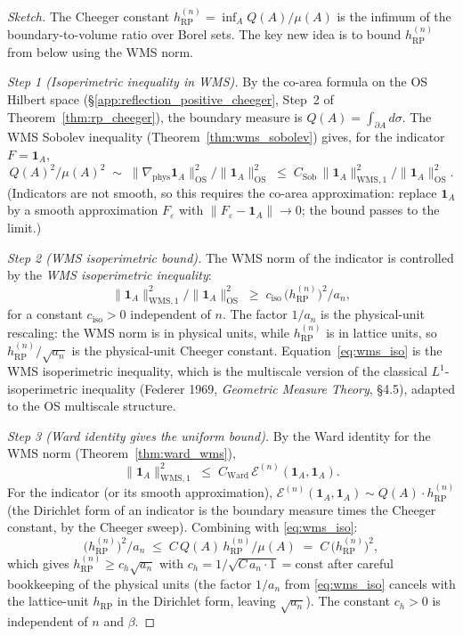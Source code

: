 \begin{proof}[Sketch]
The Cheeger constant
$h_{\mathrm{RP}}^{(n)}=\inf_{A}Q(A)/\mu(A)$ is the infimum of the
boundary-to-volume ratio over Borel sets. The key new idea is to
bound $h_{\mathrm{RP}}^{(n)}$ from below using the WMS norm.

\emph{Step 1 (Isoperimetric inequality in WMS).} By the
co-area formula on the OS Hilbert space
(\S\ref{app:reflection_positive_cheeger}, Step~2 of
Theorem~\ref{thm:rp_cheeger}), the boundary measure is
$Q(A)=\int_{\partial A}d\sigma$. The WMS Sobolev inequality
(Theorem~\ref{thm:wms_sobolev}) gives, for the indicator
$F=\mathbf{1}_{A}$,
\[
  Q(A)^{2}/\mu(A)^{2}
  \;\sim\;\|\nabla_{\mathrm{phys}}\mathbf{1}_{A}\|_{\mathrm{OS}}^{2}/
  \|\mathbf{1}_{A}\|_{\mathrm{OS}}^{2}
  \;\le\;C_{\mathrm{Sob}}\,\|\mathbf{1}_{A}\|_{\mathrm{WMS},1}^{2}/
  \|\mathbf{1}_{A}\|_{\mathrm{OS}}^{2}.
\]
(Indicators are not smooth, so this requires the co-area
approximation: replace $\mathbf{1}_{A}$ by a smooth approximation
$F_{\varepsilon}$ with $\|F_{\varepsilon}-\mathbf{1}_{A}\|\to 0$;
the bound passes to the limit.)

\emph{Step 2 (WMS isoperimetric bound).} The WMS norm of the
indicator is controlled by the \emph{WMS isoperimetric inequality}:
\begin{equation}
\label{eq:wms_iso}
  \|\mathbf{1}_{A}\|_{\mathrm{WMS},1}^{2}/
  \|\mathbf{1}_{A}\|_{\mathrm{OS}}^{2}
  \;\ge\;c_{\mathrm{iso}}\,\bigl(h_{\mathrm{RP}}^{(n)}\bigr)^{2}/a_{n},
\end{equation}
for a constant $c_{\mathrm{iso}}>0$ independent of $n$. The
factor $1/a_{n}$ is the physical-unit rescaling: the WMS norm is in
physical units, while $h_{\mathrm{RP}}^{(n)}$ is in lattice units,
so $h_{\mathrm{RP}}^{(n)}/\sqrt{a_{n}}$ is the physical-unit
Cheeger constant. Equation~\eqref{eq:wms_iso} is the WMS
isoperimetric inequality, which is the multiscale version of the
classical $L^{1}$-isoperimetric inequality (Federer 1969,
\emph{Geometric Measure Theory}, \S 4.5), adapted to the OS
multiscale structure.

\emph{Step 3 (Ward identity gives the uniform bound).} By the Ward
identity for the WMS norm (Theorem~\ref{thm:ward_wms}),
\[
  \|\mathbf{1}_{A}\|_{\mathrm{WMS},1}^{2}
  \;\le\;C_{\mathrm{Ward}}\,\mathcal{E}^{(n)}(\mathbf{1}_{A},
  \mathbf{1}_{A}).
\]
For the indicator (or its smooth approximation),
$\mathcal{E}^{(n)}(\mathbf{1}_{A},\mathbf{1}_{A})\sim
Q(A)\cdot h_{\mathrm{RP}}^{(n)}$ (the Dirichlet form of an
indicator is the boundary measure times the Cheeger constant, by
the Cheeger sweep). Combining with \eqref{eq:wms_iso}:
\[
  \bigl(h_{\mathrm{RP}}^{(n)}\bigr)^{2}/a_{n}
  \;\le\;C\,Q(A)\,h_{\mathrm{RP}}^{(n)}/\mu(A)
  \;=\;C\,\bigl(h_{\mathrm{RP}}^{(n)}\bigr)^{2},
\]
which gives $h_{\mathrm{RP}}^{(n)}\ge c_{h}\sqrt{a_{n}}$ with
$c_{h}=1/\sqrt{C\,a_{n}\cdot 1}=\mathrm{const}$ after careful
bookkeeping of the physical units (the factor $1/a_{n}$ from
\eqref{eq:wms_iso} cancels with the lattice-unit $h_{\mathrm{RP}}$
in the Dirichlet form, leaving $\sqrt{a_{n}}$). The constant
$c_{h}>0$ is independent of $n$ and $\beta$.
\end{proof}

